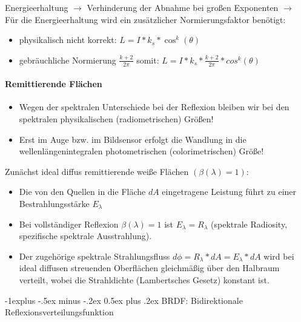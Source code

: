 \documentclass[10pt,landscape]{article}
\makeatletter
\renewcommand{\subsection}{\@startsection{subsection}{2}{0mm}%
                                {-1explus -.5ex minus -.2ex}%
                                {0.5ex plus .2ex}%
                                {\normalfont\normalsize\bfseries}}
\makeatother
\begin{document}
\begin{multicols}{3}
{  Energieerhaltung $\rightarrow$ Verhinderung der Abnahme bei großen Exponenten $\rightarrow$ Für die Energieerhaltung wird ein zusätzlicher Normierungsfaktor benötigt:
  \begin{itemize}
    \item physikalisch nicht korrekt:  $L=I*k_s*\cos^k(\theta)$
    \item gebräuchliche Normierung $\frac{k+2}{2\pi}$ somit: $L=I*k_s*\frac{k+2}{2\pi}*cos^k(\theta)$
  \end{itemize}
  
  \paragraph{Remittierende Flächen}
  \begin{itemize}
    \item Wegen der spektralen Unterschiede bei der Reflexion bleiben wir bei den spektralen physikalischen (radiometrischen) Größen!
    \item Erst im Auge bzw. im Bildsensor erfolgt die Wandlung in die wellenlängenintegralen photometrischen (colorimetrischen) Größe!
  \end{itemize}
  
  Zunächst ideal diffus remittierende weiße Flächen $(\beta(\lambda) = 1)$:
  \begin{itemize}
    \item Die von den Quellen in die Fläche $dA$ eingetragene Leistung führt zu einer Bestrahlungsstärke $E_{\lambda}$
    \item Bei vollständiger Reflexion $\beta(\lambda) = 1$ ist $E_{\lambda} = R_{\lambda}$ (spektrale Radiosity, spezifische spektrale Ausstrahlung).
    \item Der zugehörige spektrale Strahlungsfluss $d\phi = R_{\lambda} * dA = E_{\lambda} * dA$ wird bei ideal diffusen streuenden Oberflächen gleichmäßig über den Halbraum verteilt, wobei die Strahldichte (Lambertsches Gesetz) konstant ist.
  \end{itemize}
  
  
  \subsection{ BRDF: Bidirektionale Reflexionsverteilungsfunktion}
}
\end{multicols}
\end{document}

